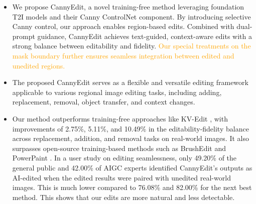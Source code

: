 \documentclass{article}
\begin{document}
\vspace{-1mm}
\begin{itemize}
\item We propose CannyEdit, a novel training-free method leveraging foundation T2I models and their Canny ControlNet component. By introducing selective Canny control, our approach enables region-based edits. Combined with dual-prompt guidance, CannyEdit achieves text-guided, context-aware edits with a strong balance between editability and fidelity. \textcolor{orange}{Our special treatments on the mask boundary further ensures seamless integration between edited and unedited regions.}

\vspace{-1mm}

\item The proposed CannyEdit serves as a flexible and versatile editing framework applicable to various regional image editing tasks, including adding, replacement, removal, object transfer, and context changes.

\vspace{-1mm}

\item Our method outperforms training-free approaches like KV-Edit \citep{zhu2025kv}, with improvements of 2.75\%, 5.11\%, and 10.49\% in the editability-fidelity balance across replacement, addition, and removal tasks on real-world images. It also surpasses open-source training-based methods such as BrushEdit \citep{li2024brushedit} and PowerPaint \citep{zhuang2023task}. In a user study on editing seamlessness, only 49.20\% of the general public and 42.00\% of AIGC experts identified CannyEdit's outputs as AI-edited when the edited results were paired with unedited real-world images. This is much lower compared to 76.08\% and 82.00\% for the next best method. This shows that our edits are more natural and less detectable.

\end{itemize}

\end{document}
